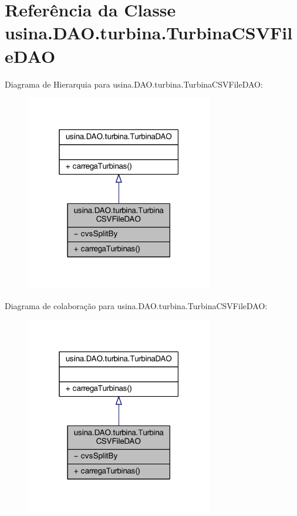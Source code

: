 \hypertarget{classusina_1_1_d_a_o_1_1turbina_1_1_turbina_c_s_v_file_d_a_o}{\section{Referência da Classe usina.\-D\-A\-O.\-turbina.\-Turbina\-C\-S\-V\-File\-D\-A\-O}
\label{classusina_1_1_d_a_o_1_1turbina_1_1_turbina_c_s_v_file_d_a_o}
}


Diagrama de Hierarquia para usina.\-D\-A\-O.\-turbina.\-Turbina\-C\-S\-V\-File\-D\-A\-O\-:\nopagebreak
\begin{figure}[H]
\begin{center}
\leavevmode
\includegraphics[width=232pt]{classusina_1_1_d_a_o_1_1turbina_1_1_turbina_c_s_v_file_d_a_o__inherit__graph}
\end{center}
\end{figure}


Diagrama de colaboração para usina.\-D\-A\-O.\-turbina.\-Turbina\-C\-S\-V\-File\-D\-A\-O\-:\nopagebreak
\begin{figure}[H]
\begin{center}
\leavevmode
\includegraphics[width=232pt]{classusina_1_1_d_a_o_1_1turbina_1_1_turbina_c_s_v_file_d_a_o__coll__graph}
\end{center}
\end{figure}
